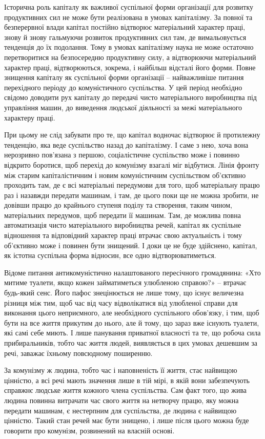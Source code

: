 \documentclass[12pt,a4paper,openany]{book}
\begin{document}
Історична роль капіталу як важливої суспільної форми організації для розвитку продуктивних сил не може бути реалізована в умовах капіталізму. За повної та безперервної влади капітал постійно відтворює матеріальний характер праці, знову й знову гальмуючи розвиток продуктивних сил там, де вимальовується тенденція до їх подолання. Тому в умовах капіталізму наука не може остаточно перетворитися на безпосередню продуктивну силу, а відтворюючи матеріальний характер праці, відтворюються, зокрема, і найбільш відсталі його форми. Повне знищення капіталу як суспільної форми організації – найважливіше питання перехідного періоду до комуністичного суспільства. У цей період необхідно свідомо доводити рух капіталу до передачі чисто матеріального виробництва під управління машин, до виведення людської діяльності за межі матеріального характеру праці.

При цьому не слід забувати про те, що капітал водночас відтворює й протилежну тенденцію, яка веде суспільство назад до капіталізму. І саме з нею, хоча вона нерозривно пов’язана з першою, соціалістичне суспільство може і повинно відкрито боротися, щоб перехід до комунізму взагалі міг відбутися. Лінія фронту між старим капіталістичним і новим комуністичним суспільством об’єктивно проходить там, де є всі матеріальні передумови для того, щоб матеріальну працю раз і назавжди передати машинам, і там, де цього поки ще не можна зробити, не довівши працю до крайнього ступеня поділу та створення, таким чином, матеріальних передумов, щоб передати її машинам. Там, де можлива повна автоматизація чисто матеріального виробництва речей, капітал як суспільне відношення та відповідний характер праці втрачає свою актуальність і тому об’єктивно може і повинен бути знищений. І доки це не буде здійснено, капітал, як істотна суспільна форма відносин, все одно відтворюватиметься.

Відоме питання антикомуністично налаштованого пересічного громадянина: «Хто митиме туалети, якщо кожен займатиметься улюбленою справою?» – втрачає будь-який сенс. Його пафос знецінюється не лише тому, що існує величезна різниця між тим, щоб час від часу відволікатися від улюбленої справи для виконання цього неприємного, але необхідного суспільного обов’язку, і тим, щоб бути на все життя прикутим до нього, але й тому, що зараз вже існують туалети, які самі себе миють. І лише панування приватної власності та те, що робоча сила прибиральників, тобто час життя людей, виявляється в цих умовах дешевшим за речі, заважає їхньому повсюдному поширенню.

За комунізму ж людина, тобто час і наповненість її життя, стає найвищою цінністю, а всі речі мають значення лише в тій мірі, в якій вони забезпечують справжнє людське життя кожного члена суспільства. Сам факт того, що жива людина повинна витрачати час свого життя на нетворчу працю, яку можна передати машинам, є нестерпним для суспільства, де людина є найвищою цінністю. Такий стан речей має бути знищено, і лише після цього можна буде говорити про комунізм, розвинений на власній основі.
\end{document}
